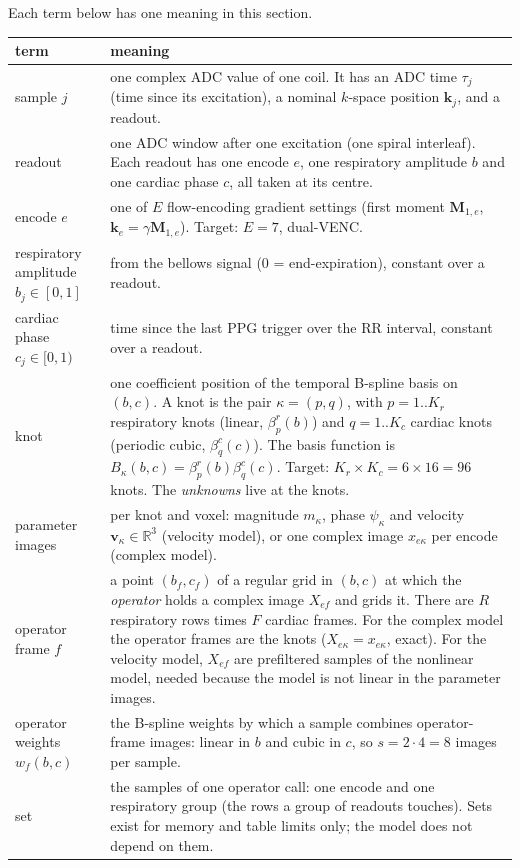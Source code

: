 \documentclass[11pt]{article}
\theoremstyle{remark}
\newcommand{\kk}{\bm k}
\newcommand{\vv}{\bm v}
\newcommand{\RR}{\mathbb R}
\begin{document}
Each term below has one meaning in this section.
\begin{center}\small
\begin{tabularx}{\linewidth}{@{}lX@{}}
\toprule
term & meaning\\
\midrule
sample $j$ & one complex ADC value of one coil. It has an ADC time $\tau_j$ (time since its excitation), a nominal $k$-space position $\kk_j$, and a readout.\\
readout & one ADC window after one excitation (one spiral interleaf). Each readout has one encode $e$, one respiratory amplitude $b$ and one cardiac phase $c$, all taken at its centre.\\
encode $e$ & one of $E$ flow-encoding gradient settings (first moment $\bm M_{1,e}$, $\bm k_e=\gamma\bm M_{1,e}$). Target: $E=7$, dual-VENC.\\
respiratory amplitude $b_j\in[0,1]$ & from the bellows signal (0 = end-expiration), constant over a readout.\\
cardiac phase $c_j\in[0,1)$ & time since the last PPG trigger over the RR interval, constant over a readout.\\
knot & one coefficient position of the temporal B-spline basis on $(b,c)$. A knot is the pair $\kappa=(p,q)$, with $p=1..K_r$ respiratory knots (linear, $\beta^r_p(b)$) and $q=1..K_c$ cardiac knots (periodic cubic, $\beta^c_q(c)$). The basis function is $B_\kappa(b,c)=\beta^r_p(b)\beta^c_q(c)$. Target: $K_r\times K_c=6\times16=96$ knots. The \emph{unknowns} live at the knots.\\
parameter images & per knot and voxel: magnitude $m_\kappa$, phase $\psi_\kappa$ and velocity $\vv_\kappa\in\RR^3$ (velocity model), or one complex image $x_{e\kappa}$ per encode (complex model).\\
operator frame $f$ & a point $(b_f,c_f)$ of a regular grid in $(b,c)$ at which the \emph{operator} holds a complex image $X_{ef}$ and grids it. There are $R$ respiratory rows times $F$ cardiac frames. For the complex model the operator frames are the knots ($X_{e\kappa}=x_{e\kappa}$, exact). For the velocity model, $X_{ef}$ are prefiltered samples of the nonlinear model, needed because the model is not linear in the parameter images.\\
operator weights $w_f(b,c)$ & the B-spline weights by which a sample combines operator-frame images: linear in $b$ and cubic in $c$, so $s=2\cdot4=8$ images per sample.\\
set & the samples of one operator call: one encode and one respiratory group (the rows a group of readouts touches). Sets exist for memory and table limits only; the model does not depend on them.\\

\end{tabularx}
\end{center}
\end{document}
